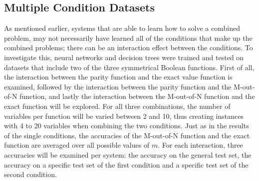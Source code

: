 \documentclass[letterpaper]{article} %
\begin{document}
\fi


\subsection{Multiple Condition Datasets}
As mentioned earlier, systems that are able to learn how to solve a combined problem, may not necessarily have learned all of the conditions that make up the combined problems; there can be an interaction effect between the conditions. To investigate this, neural networks and decision trees were trained and tested on datasets that include two of the three symmetrical Boolean functions. First of all, the interaction between the parity function and the exact value function is examined, followed by the interaction between the parity function and the M-out-of-N function, and lastly the interaction between the M-out-of-N function and the exact function will be explored. For all three combinations, the number of variables per function will be varied between 2 and 10, thus creating instances with 4 to 20 variables when combining the two conditions.  Just as in the results of the single conditions, the accuracies of the M-out-of-N function and the exact function are averaged over all possible values of $m$. For each interaction, three accuracies will be examined per system: the accuracy on the general test set, the accuracy on a specific test set of the first condition and a specific test set of the second condition.

\begin{table}[b!]
\centering
\caption{The mean accuracies of the decision tree on each test set after training on each interaction.}
\label{tbl:interactions_DT}
\end{table}
\end{document}
